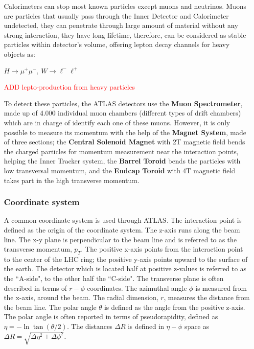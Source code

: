Calorimeters can stop most known particles except muons and neutrinos. Muons are particles that usually pass through the
Inner Detector and Calorimeter undetected, they can penetrate through large amount of material without any strong
interaction, they have long lifetime, therefore, can be considered as stable particles within detector's volume, offering lepton decay channels for heavy objects as:\par
$H\rightarrow \mu^+\mu^-$, $W\rightarrow \ell^-\ell^+$

\textcolor{red}{ADD lepto-production from heavy particles}
\par
To detect these particles, the ATLAS detectors use the {\bf Muon Spectrometer}, made up of 4.000 individual muon chambers
(different types of drift
chambers) which are in charge of identify each one of these muons. However, it is only possible to measure its momentum with the help of the {\bf
Magnet System}, made of three sections; the {\bf Central Solenoid Magnet} with 2T
magnetic field bends the
charged particles for momentum measurement near the interaction points, helping the Inner Tracker system, the {\bf
Barrel Toroid} bends the particles with low transversal momentum, and the {\bf Endcap Toroid} with 4T magnetic field takes part in the
high transverse momentum.\par
\subsubsection{Coordinate system}

A common coordinate system is used through ATLAS. The interaction point is defined as the origin of the coordinate
system. The z-axis runs along the beam line. The x-y plane is perpendicular to the beam line and is referred to as the
transverse momentum, $p_T$. The positive x-axis points from the interaction point to the center of the LHC ring; the
positive y-axis points upward to the surface of the earth. The detector which is located half at positive z-values is referred to as the
``A-side", to the other half the ``C-side". The transverse plane is often described in terms of $r-\phi$ coordinates. The
azimuthal angle $\phi$ is measured from the x-axis, around the beam. The radial dimension, $r$, measures the distance
from the beam line. The polar angle $\theta$ is defined as the angle from the positive z-axis. The polar angle is often
reported in terms of pseudorapidity, defined as $\eta = -\ln \tan (\theta/2)$. The distances $\Delta R$ is defined in
$\eta-\phi$ space as $\Delta R = \sqrt{\Delta \eta^2 + \Delta \phi^2}$.\par





